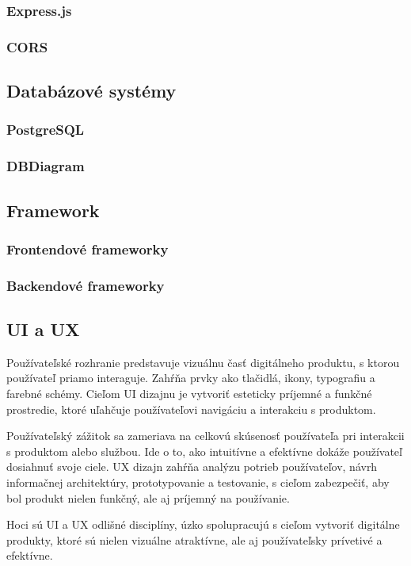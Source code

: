 \subsubsection{Express.js}
\subsubsection{CORS}
\subsection{Databázové systémy}
\subsubsection{PostgreSQL}
\subsubsection{DBDiagram}
\subsection{Framework}
\subsubsection{Frontendové frameworky}
\subsubsection{Backendové frameworky}


\subsection{UI a UX}
Používateľské rozhranie predstavuje vizuálnu časť digitálneho produktu, s ktorou používateľ priamo interaguje. 
Zahŕňa prvky ako tlačidlá, ikony, typografiu a farebné schémy. 
Cieľom UI dizajnu je vytvoriť esteticky príjemné a funkčné prostredie, ktoré uľahčuje používateľovi navigáciu a interakciu s produktom.

Používateľský zážitok sa zameriava na celkovú skúsenosť používateľa pri interakcii s produktom alebo službou. 
Ide o to, ako intuitívne a efektívne dokáže používateľ dosiahnuť svoje ciele. 
UX dizajn zahŕňa analýzu potrieb používateľov, návrh informačnej architektúry, prototypovanie a testovanie, s cieľom zabezpečiť, aby bol produkt nielen funkčný, ale aj príjemný na používanie.

Hoci sú UI a UX odlišné disciplíny, úzko spolupracujú s cieľom vytvoriť digitálne produkty, ktoré sú nielen vizuálne atraktívne, ale aj používateľsky prívetivé a efektívne.\cite{uiux}
